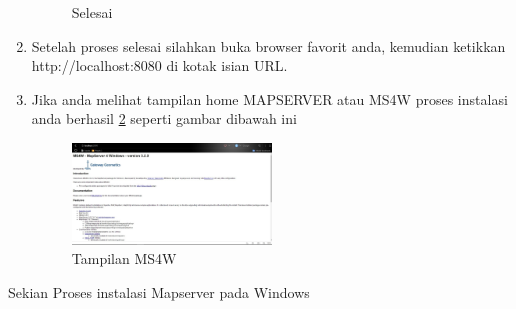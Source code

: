 \begin{enumerate}
\begin{figure}[ht]
	    \caption{Selesai}
		\label{gambar3}
		\end{figure}
\item
Setelah proses selesai silahkan buka browser favorit anda, kemudian ketikkan http://localhost:8080 di kotak isian URL.
\item
Jika anda melihat tampilan home MAPSERVER atau MS4W proses instalasi anda berhasil \ref{gambar4} seperti gambar dibawah ini
\begin{figure}[ht]
	    \centerline{\includegraphics[width=0.50\textwidth]{figures/gambar4.JPG}}
	    \caption{Tampilan MS4W}
		\label{gambar4}
		\end{figure}
\end{enumerate}
Sekian Proses instalasi Mapserver pada Windows
